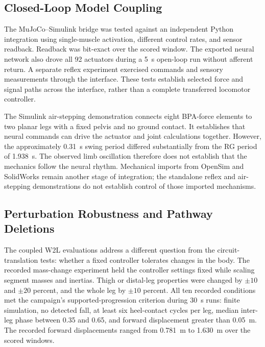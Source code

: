 \subsection{Closed-Loop Model Coupling}

The MuJoCo--Simulink bridge was tested against an independent Python integration using single-muscle activation, different control rates, and sensor readback. Readback was bit-exact over the scored window. The exported neural network also drove all 92 actuators during a \qty{5}{\second} open-loop run without afferent return. A separate reflex experiment exercised commands and sensory measurements through the interface. These tests establish selected force and signal paths across the interface, rather than a complete transferred locomotor controller.

The Simulink air-stepping demonstration connects eight BPA-force elements to two planar legs with a fixed pelvis and no ground contact. It establishes that neural commands can drive the actuator and joint calculations together. However, the approximately \qty{0.31}{\second} swing period differed substantially from the RG period of \qty{1.938}{\second}. The observed limb oscillation therefore does not establish that the mechanics follow the neural rhythm. Mechanical imports from OpenSim and SolidWorks remain another stage of integration; the standalone reflex and air-stepping demonstrations do not establish control of those imported mechanisms.

\subsection{Perturbation Robustness and Pathway Deletions}\label{sec:w2l_perturbation}

The coupled W2L evaluations address a different question from the circuit-translation tests: whether a fixed controller tolerates changes in the body. The recorded mass-change experiment held the controller settings fixed while scaling segment masses and inertias. Thigh or distal-leg properties were changed by $\pm10$ and $\pm20$ percent, and the whole leg by $\pm10$ percent. All ten recorded conditions met the campaign's supported-progression criterion during \qty{30}{\second} runs: finite simulation, no detected fall, at least six heel-contact cycles per leg, median inter-leg phase between 0.35 and 0.65, and forward displacement greater than \qty{0.05}{\metre}. The recorded forward displacements ranged from \qty{0.781}{\metre} to \qty{1.630}{\metre} over the scored windows.


